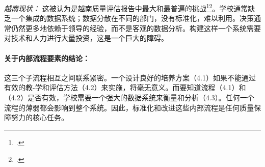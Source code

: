 \textit{越南现状：} 这被认为是越南质量评估报告中最大和最普遍的挑战\footcite{CommonFailureCriteria}\footcite{AUN-QA_Challenges_VN}。学校通常缺乏一个集成的数据系统；数据分散在不同的部门，没有标准化，难以利用。决策通常仍然更多地依赖于领导的经验，而不是客观的数据分析。构建这样一个系统需要对技术和人力进行大量投资，这是一个巨大的障碍。

\paragraph{关于内部流程要素的结论：}
这三个子流程相互之间联系紧密。一个设计良好的培养方案（4.1）如果不能通过有效的教-学和评估方法（4.2）来实施，将毫无意义。而要知道流程（4.1）和（4.2）是否有效，学校需要一个强大的数据系统来衡量和分析（4.3）。任何一个流程的薄弱都会影响到整个系统。因此，标准化和改进这些内部流程是任何质量保障努力的核心任务。




















